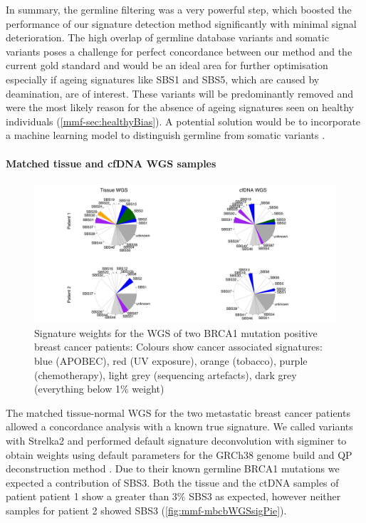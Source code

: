 In summary, the germline filtering was a very powerful step, which boosted the performance of our signature detection method significantly with minimal signal deterioration. The high overlap of germline database variants and somatic variants poses a challenge for perfect concordance between our method and the current gold standard and would be an ideal area for further optimisation especially if ageing signatures like SBS1 and SBS5, which are caused by deamination, are  of interest. These  variants will be predominantly removed and were the most likely reason for the absence of ageing signatures seen on healthy individuals (\autoref{mmf-sec:healthyBias}). A potential solution would be to incorporate a machine learning model to distinguish germline from somatic variants \cite{Spinella2016,Sahraeian2022}.

\paragraph{Matched tissue and cfDNA WGS samples}
\label{mmf-sec:matchedMBCB}

\begin{figure}[ht]
\centering
\includegraphics[width=.99\linewidth]{Figures/MisMatchFinder/mbcbWGSsignatures.pdf}
\caption[Signature weights for the WGS of two BRCA1 mutation positive breast cancer patients]{Signature weights for the WGS of two BRCA1 mutation positive breast cancer patients: Colours show cancer associated signatures: blue (APOBEC), red (UV exposure), orange (tobacco), purple (chemotherapy), light grey (sequencing artefacts), dark grey (everything below 1\% weight)}\label{fig:mmf-mbcbWGSsigPie}
\end{figure}
 
The matched tissue-normal WGS for the two metastatic breast cancer patients allowed a concordance analysis with a known true signature. We called variants with Strelka2 and performed default signature deconvolution with sigminer to obtain weights using default parameters for the GRCh38 genome build and QP deconstruction method  \cite{Wang2021}. Due to their known germline BRCA1 mutations we expected a contribution of SBS3. Both the tissue and the ctDNA samples of patient patient 1 show a greater than 3\% SBS3 as expected, however neither samples for patient 2 showed SBS3 (\autoref{fig:mmf-mbcbWGSsigPie}).
 
